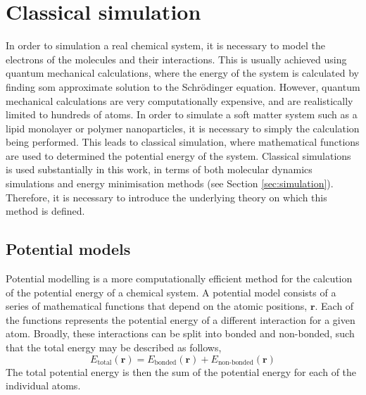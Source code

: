 \section{Classical simulation}
\label{sec:classical}

In order to simulation a real chemical system, it is necessary to model the electrons of the molecules and their interactions.
This is usually achieved using quantum mechanical calculations, where the energy of the system is calculated by finding som approximate solution to the Schr\"{o}dinger equation.
However, quantum mechanical calculations are very computationally expensive, and are realistically limited to hundreds of atoms.
In order to simulate a soft matter system such as a lipid monolayer or polymer nanoparticles, it is necessary to simply the calculation being performed.
This leads to classical simulation, where mathematical functions are used to determined the potential energy of the system.
Classical simulations is used substantially in this work, in terms of both molecular dynamics simulations and energy minimisation methods (see Section \ref{sec:simulation}).
Therefore, it is necessary to introduce the underlying theory on which this method is defined.

\subsection{Potential models}
\label{sec:potentmodels}
Potential modelling is a more computationally efficient method for the calcution of the potential energy of a chemical system.
A potential model consists of a series of mathematical functions that depend on the atomic positions, $\mathbf{r}$.
Each of the functions represents the potential energy of a different interaction for a given atom.
Broadly, these interactions can be split into bonded and non-bonded, such that the total energy may be described as follows,
%
\begin{equation}
  E_{\text{total}}(\mathbf{r}) = E_{\text{bonded}}(\mathbf{r}) + E_{\text{non-bonded}}(\mathbf{r})
\end{equation}
%
The total potential energy is then the sum of the potential energy for each of the individual atoms.

